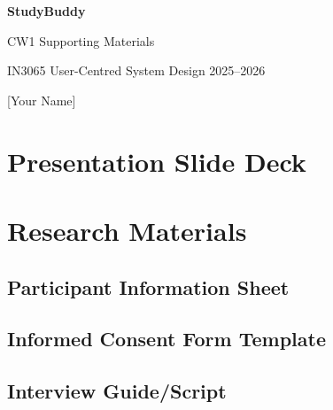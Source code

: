 \documentclass[a4paper,11pt]{article}
\begin{document}
\begin{titlepage}
    \centering
    \vspace*{3cm}
    {\LARGE\bfseries StudyBuddy\par}
    \vspace{0.4cm}
    {\Large CW1 Supporting Materials\par}
    \vspace{1.5cm}
    {\large IN3065 User-Centred System Design 2025--2026\par}
    \vspace{1cm}
    {\large [Your Name]\par}
    \vfill
    \newpage
    \tableofcontents
    \vspace{2cm}
\end{titlepage}

\newpage
\section{Presentation Slide Deck}

\newpage
\section{Research Materials}

\subsection{Participant Information Sheet}

\newpage
\subsection{Informed Consent Form Template}

\newpage
\subsection{Interview Guide/Script}

\newpage
\printbibliography[heading=bibintoc]
\end{document}

